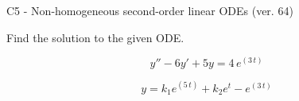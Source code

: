 \begin{exercise}
  \begin{exerciseTitle}C5 - Non-homogeneous second-order linear ODEs (ver. 64)\end{exerciseTitle}
  \begin{exerciseStatement}
    
Find the solution to the given ODE.

    
\[y''-6y'+5y = 4 \, e^{\left(3 \, t\right)}\]

  \end{exerciseStatement}
  \begin{exerciseAnswer}
    
\[y= k_{1} e^{\left(5 \, t\right)} + k_{2} e^{t} - e^{\left(3 \, t\right)}\]

  \end{exerciseAnswer}
\end{exercise}